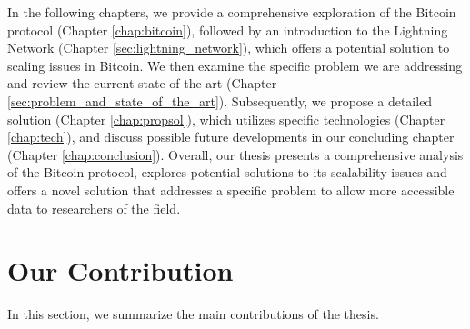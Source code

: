 In the following chapters, we provide a comprehensive exploration of the Bitcoin protocol
(Chapter \ref{chap:bitcoin}), followed by an introduction to the Lightning Network
(Chapter \ref{sec:lightning_network}), which offers a potential solution to scaling issues
in Bitcoin. We then examine the specific problem we are addressing and review the current
state of the art (Chapter \ref{sec:problem_and_state_of_the_art}). Subsequently, we propose
a detailed solution (Chapter \ref{chap:propsol}), which utilizes specific technologies
(Chapter \ref{chap:tech}), and discuss possible future developments in our concluding chapter
(Chapter \ref{chap:conclusion}). Overall, our thesis presents a comprehensive analysis of the
Bitcoin protocol, explores potential solutions to its scalability issues and offers a novel
solution that addresses a specific problem to allow more accessible data to researchers of the
field.

\section*{Our Contribution}

In this section, we summarize the main contributions of the thesis.

